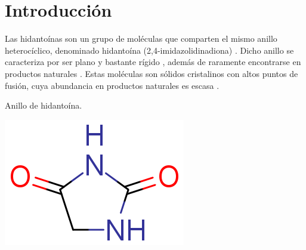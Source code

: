 \documentclass[fleqn,10pt]{SelfArx}
\begin{document}
\flushbottom %

\maketitle %


\thispagestyle{empty} %




\section*{Introducci\'on} %
Las hidantoínas son un grupo de moléculas que comparten el mismo anillo heterocíclico, denominado hidantoína (2,4-imidazolidinadiona) \cite{m2015}\cite{kroschwitz2007}. Dicho anillo se caracteriza por ser plano y bastante rígido \cite{m2015}, además de raramente encontrarse en productos naturales \cite{kroschwitz2007}. Estas moléculas son sólidos cristalinos con altos puntos de fusión, cuya abundancia en productos naturales es escasa \cite{kroschwitz2007}.
\begin{scheme}[h]
	\centering
	\caption{Anillo de hidanto\'ina.}
	\includegraphics[width=0.3\linewidth]{structures/hydantoin.png}
\end{scheme}
\end{document}
